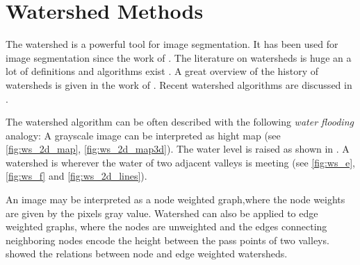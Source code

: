\section{Watershed Methods}\label{sec:rw_watershed_methods}

The watershed is a powerful tool for image segmentation.
It has been used for image segmentation since the work of
\citet{beucher_1979_workshop}.
The literature on watersheds is huge an 
a lot of definitions and algorithms exist
\citep{vinent_1991_pami,beuchner_1994_waterfall,najman_1994_sp,
roerdink_2000_finf,bertrand_2005_jmiv,cousty_2009_pami,
meyer_2012_corr,meyer_2012_corr2}.
A great overview  of the history of watersheds 
is given in the work of \citet{meyer_2012_corr}.
Recent watershed algorithms are discussed in \citep{meyer_2012_corr2}.

The watershed algorithm can be often described with the following  \emph{water flooding} analogy:
A grayscale  image can be interpreted as hight map (see \cref{fig:ws_2d_map}, \cref{fig:ws_2d_map3d}).
The water level is raised as shown in .
A watershed is wherever the water of two adjacent valleys is meeting (see \cref{fig:ws_e},\cref{fig:ws_f} and \cref{fig:ws_2d_lines}).


An image may be interpreted as a node weighted graph,where the node weights
are given by the pixels gray value.
Watershed can also be applied to edge weighted graphs, where the nodes are unweighted 
and the edges connecting neighboring nodes encode the height between the pass points of two valleys.
\citet{meyer_2012_corr2} showed the relations between node and edge weighted watersheds. 





